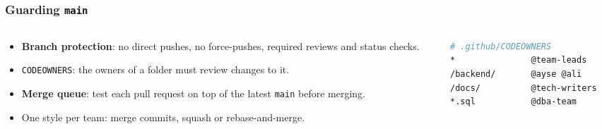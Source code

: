 \documentclass[aspectratio=169,10pt,compress]{beamer}
\begin{document}
\begin{frame}[t,fragile] \frametitle{Guarding \texttt{main}}
  \begin{columns}[T]
    \begin{column}{0.5\textwidth}
      \begin{itemize}\small
        \item \textbf{Branch protection}: no direct pushes, no force-pushes, required reviews and status checks.
        \item \texttt{CODEOWNERS}: the owners of a folder must review changes to it.
        \item \textbf{Merge queue}: test each pull request on top of the latest \texttt{main} before merging.
        \item One style per team: merge commits, squash or rebase-and-merge.
      \end{itemize}
    \end{column}
    \begin{column}{0.46\textwidth}


\begin{lstlisting}[style=codesnippet, language=bash, basicstyle=\ttfamily\scriptsize]
# .github/CODEOWNERS
*               @team-leads
/backend/       @ayse @ali
/docs/          @tech-writers
*.sql           @dba-team
\end{lstlisting}


    \end{column}
  \end{columns}
\end{frame}
\end{document}
